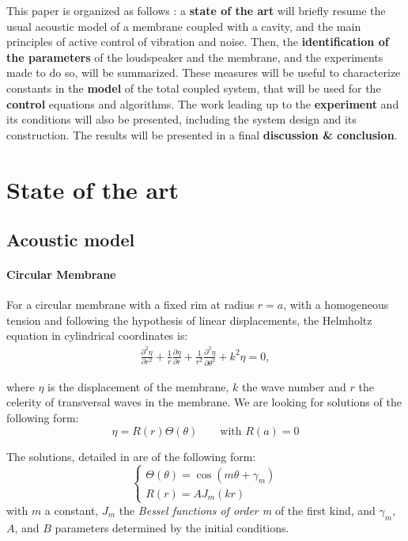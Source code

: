 \documentclass[11pt, twocolumn]{article}
\begin{document}
This paper is organized as follows : a \textbf{state of the art} will briefly resume the usual acoustic model of a membrane coupled with a cavity, and the main principles of active control of vibration and noise. Then, the \textbf{identification of the parameters} of the loudspeaker and the membrane, and the experiments made to do so, will be summarized. These measures will be useful to characterize constants in the \textbf{model} of the total coupled system, that will be used for the %
\textbf{control} equations and algorithms. The work leading up to the \textbf{experiment} and its conditions will also be presented, including the system design and its construction. The results will be presented in a final \textbf{discussion \& conclusion}.

\section{State of the art}
\subsection{Acoustic model}
\label{AcouModel}

\paragraph{Circular Membrane}
\label{circucu}
For a circular membrane with a fixed rim at radius $r=a$, with a homogeneous tension and following the hypothesis of linear displacements, the Helmholtz equation in cylindrical coordinates is:
\begin{align}
\frac{\partial^2\eta}{\partial r^2}+\frac{1}{r}\frac{\partial\eta}{\partial r}+\frac{1}{r^2}\frac{\partial^2\eta}{\partial \theta^2}+k^2\eta = 0,
\label{eq_circular_membrane}
\end{align}

where $\eta$ is the displacement of the membrane, $k$ the wave number and $r$ the celerity of transversal waves in the membrane. We are looking for solutions of the following form:
$$
\eta = R(r)\Theta(\theta) \quad\quad \text{with }R(a)=0
$$

The solutions, detailed in \cite{fundacou} are of the following form:
$$
\begin{cases}
\Theta(\theta) = \cos(m\theta + \gamma_m)\\
R(r) = A J_m(kr)
\end{cases}
$$
with $m$ a constant, $J_m$ the \textit{Bessel functions of order m} of the first kind, and $\gamma_m$, $A$, and $B$ parameters determined by the initial conditions.
\end{document}
